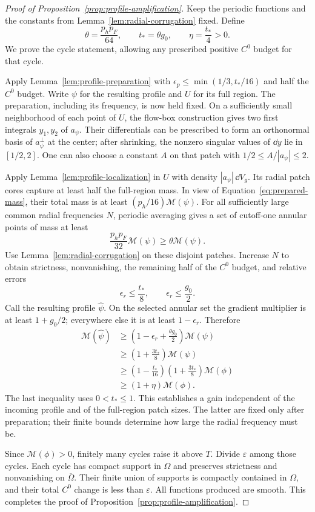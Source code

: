 \begin{proof}[Proof of Proposition~\ref{prop:profile-amplification}]
Keep the periodic functions and the constants from
Lemma~\ref{lem:radial-corrugation} fixed.  Define
\[
 \theta=\frac{p_h p_F}{64},\qquad
 t_* =\theta g_0,\qquad \eta=\frac{t_*}{4}>0.
\]
We prove the cycle statement, allowing any prescribed positive $C^0$
budget for that cycle.

Apply Lemma~\ref{lem:profile-preparation} with
$\epsilon_p\le\min(1/3,t_*/16)$ and half the $C^0$ budget.  Write
$\psi$ for the resulting profile and $U$ for its full region.  The
preparation, including its frequency, is now held fixed.  On a sufficiently
small neighborhood of each point of $U$, the flow-box construction gives
two first integrals $y_1,y_2$ of $a_\psi$.  Their differentials can be
prescribed to form an orthonormal basis of $a_\psi^\perp$ at the center;
after shrinking, the nonzero singular values of $\dd y$ lie in $[1/2,2]$.
One can also choose a constant $A$ on that patch with
$1/2\le A/|a_\psi|\le2$.

Apply Lemma~\ref{lem:profile-localization} in $U$ with density
$|a_\psi|\,\dd V_g$.  Its radial patch cores capture at least half the
full-region mass.  In view of Equation~\eqref{eq:prepared-mass}, their
total mass is at least $(p_h/16)\mathcal M(\psi)$.  For all sufficiently
large common radial frequencies $N$, periodic averaging gives a set of
cutoff-one annular points of mass at least
\[
 \frac{p_h p_F}{32}\mathcal M(\psi)
 \ge\theta\mathcal M(\psi).
\]
Use Lemma~\ref{lem:radial-corrugation} on these disjoint patches.  Increase
$N$ to obtain strictness, nonvanishing, the remaining half of the $C^0$
budget, and relative errors
\[
 \epsilon_r\le\frac{t_*}{8},\qquad \epsilon_r\le\frac{g_0}{2}.
\]
Call the resulting profile $\widehat\psi$.  On the selected annular set
the gradient multiplier is at least $1+g_0/2$; everywhere else it is at
least $1-\epsilon_r$.  Therefore
\begin{align*}
 \mathcal M(\widehat\psi)
 &\ge\left(1-\epsilon_r+\frac{\theta g_0}{2}\right)
          \mathcal M(\psi)\\
 &\ge\left(1+\frac{3t_*}{8}\right)\mathcal M(\psi)\\
 &\ge\left(1-\frac{t_*}{16}\right)
          \left(1+\frac{3t_*}{8}\right)\mathcal M(\phi)\\
 &\ge(1+\eta)\mathcal M(\phi).
\end{align*}
The last inequality uses $0<t_*\le1$.  This establishes a gain independent
of the incoming profile and of the full-region patch sizes.  The latter
are fixed only after preparation; their finite bounds determine how large
the radial frequency must be.

Since $\mathcal M(\phi)>0$, finitely many cycles raise it above $T$.
Divide $\varepsilon$ among those cycles.  Each cycle has compact support
in $\Omega$ and preserves strictness and nonvanishing on
$\overline\Omega$.  Their finite union of supports is compactly contained
in $\Omega$, and their total $C^0$ change is less than $\varepsilon$.
All functions produced are smooth.  This completes the proof of
Proposition~\ref{prop:profile-amplification}.
\end{proof}

